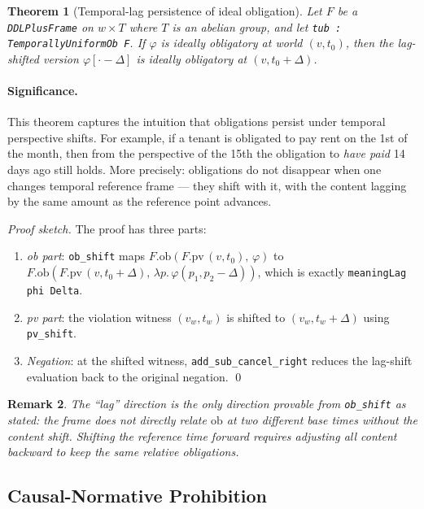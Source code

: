 \documentclass[]{article}
\newtheorem{theorem}{Theorem}
\newtheorem{remark}[theorem]{Remark}
\newcommand{\code}[1]{\texttt{#1}}
\begin{document}
\begin{theorem}[Temporal-lag persistence of ideal obligation]
\label{thm:temporal}
Let $F$ be a \code{DDLPlusFrame} on $w \times T$ where $T$ is an abelian group,
and let \code{tub : TemporallyUniformOb F}.  If $\varphi$ is ideally obligatory
at world $(v, t_0)$, then the lag-shifted version $\varphi[\cdot - \Delta]$
is ideally obligatory at $(v, t_0 + \Delta)$.
\end{theorem}

\paragraph{Significance.}
This theorem captures the intuition that obligations persist under
temporal perspective shifts.  For example, if a tenant is obligated to pay
rent on the 1st of the month, then from the perspective of the 15th the
obligation to \emph{have paid} 14 days ago still holds.  More precisely:
obligations do not disappear when one changes temporal reference frame ---
they shift with it, with the content lagging by the same amount as the
reference point advances.

\noindent
\emph{Proof sketch.}
The proof has three parts:
\begin{enumerate}
\item \emph{ob part}: \code{ob\_shift} maps
      $F.\text{ob}(F.\text{pv}\,(v, t_0),\, \varphi)$ to
      $F.\text{ob}(F.\text{pv}\,(v, t_0+\Delta),\, \lambda p.\,\varphi(p_1, p_2{-}\Delta))$,
      which is exactly \code{meaningLag phi Delta}.
\item \emph{pv part}: the violation witness $(v_w, t_w)$ is
      shifted to $(v_w, t_w + \Delta)$ using \code{pv\_shift}.
\item \emph{Negation}: at the shifted witness, \code{add\_sub\_cancel\_right}
      reduces the lag-shift evaluation back to the original negation. \qed
\end{enumerate}

\begin{remark}
The ``lag'' direction is the only direction provable from \code{ob\_shift} as
stated: the frame does not directly relate $\text{ob}$ at two different base
times without the content shift.  Shifting the reference time forward requires
adjusting all content backward to keep the same relative obligations.
\end{remark}

\subsection{Causal-Normative Prohibition}
\end{document}
